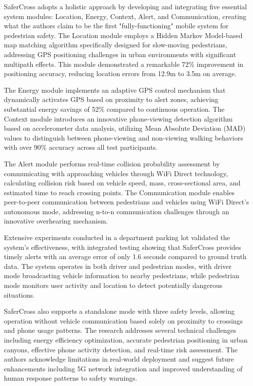 \documentclass[a4paper, 12pt]{report}
\begin{document}
SaferCross adopts a holistic approach by developing and integrating five essential system modules: Location, Energy, Context, Alert, and Communication, creating what the authors claim to be the first "fully-functioning" mobile system for pedestrian safety. The Location module employs a Hidden Markov Model-based map matching algorithm specifically designed for slow-moving pedestrians, addressing GPS positioning challenges in urban environments with significant multipath effects. This module demonstrated a remarkable 72\% improvement in positioning accuracy, reducing location errors from 12.9m to 3.5m on average.

The Energy module implements an adaptive GPS control mechanism that dynamically activates GPS based on proximity to alert zones, achieving substantial energy savings of 52\% compared to continuous operation. The Context module introduces an innovative phone-viewing detection algorithm based on accelerometer data analysis, utilizing Mean Absolute Deviation (MAD) values to distinguish between phone-viewing and non-viewing walking behaviors with over 90\% accuracy across all test participants.

The Alert module performs real-time collision probability assessment by communicating with approaching vehicles through WiFi Direct technology, calculating collision risk based on vehicle speed, mass, cross-sectional area, and estimated time to reach crossing points. The Communication module enables peer-to-peer communication between pedestrians and vehicles using WiFi Direct's autonomous mode, addressing n-to-n communication challenges through an innovative overhearing mechanism.

Extensive experiments conducted in a department parking lot validated the system's effectiveness, with integrated testing showing that SaferCross provides timely alerts with an average error of only 1.6 seconds compared to ground truth data. The system operates in both driver and pedestrian modes, with driver mode broadcasting vehicle information to nearby pedestrians, while pedestrian mode monitors user activity and location to detect potentially dangerous situations.

SaferCross also supports a standalone mode with three safety levels, allowing operation without vehicle communication based solely on proximity to crossings and phone usage patterns. The research addresses several technical challenges including energy efficiency optimization, accurate pedestrian positioning in urban canyons, effective phone activity detection, and real-time risk assessment. The authors acknowledge limitations in real-world deployment and suggest future enhancements including 5G network integration and improved understanding of human response patterns to safety warnings.
\end{document}
